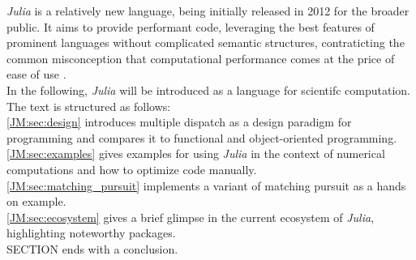 \textit{Julia} \cite{JMBezansonEtAl2015} is a relatively new language, being initially released in 2012 for the broader public. It aims to provide performant code, leveraging the best features of 
prominent languages without complicated semantic structures, contraticting the common misconception that computational performance comes at the price of ease of use \cite{JMEdelman2019}. \\

In the following, \textit{Julia} will be introduced as a language for scientifc computation. The text is structured as follows: \\
\ref{JM:sec:design} introduces multiple dispatch as a design paradigm for programming and compares it to functional and object-oriented programming.\\
\ref{JM:sec:examples} gives examples for using \textit{Julia} in the context of numerical computations and how to optimize code manually.\\
\ref{JM:sec:matching_pursuit} implements a variant of matching pursuit as a hands on example.\\
\ref{JM:sec:ecosystem} gives a brief glimpse in the current ecosystem of \textit{Julia}, highlighting noteworthy packages.\\
SECTION ends with a conclusion.

\newpage


%
